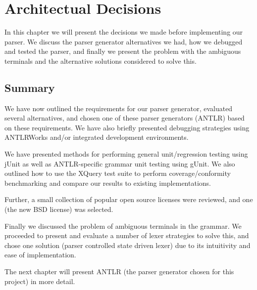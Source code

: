 \chapter{Architectual Decisions}
\label{chapter:method}

In this chapter we will present the decisions we made before implementing our
parser. We discuss the parser generator alternatives we had, how we debugged and
tested the parser, and finally we present the problem with the ambiguous
terminals and the alternative solutions considered to solve this.






\section{Summary}
We have now outlined the requirements for our parser generator, evaluated
several alternatives, and chosen one of these parser generators (ANTLR) based on
these requirements. We have also briefly presented debugging
strategies using ANTLRWorks and/or integrated development environments.

We have presented methods for performing general unit/regression testing
using jUnit as well as ANTLR-specific grammar unit testing using gUnit. We also
outlined how to use the XQuery test suite to perform coverage/conformity
benchmarking and compare our results to existing implementations.

Further, a small collection of popular open source licenses were reviewed, and
one (the new BSD license) was selected.

Finally we discussed the problem of ambiguous terminals in the grammar. We
proceeded to present and evaluate a number of lexer strategies to solve this,
and chose one solution (parser controlled state driven lexer) due to its
intuitivity and ease of implementation.

The next chapter will present ANTLR (the parser generator chosen for this
project) in more detail.